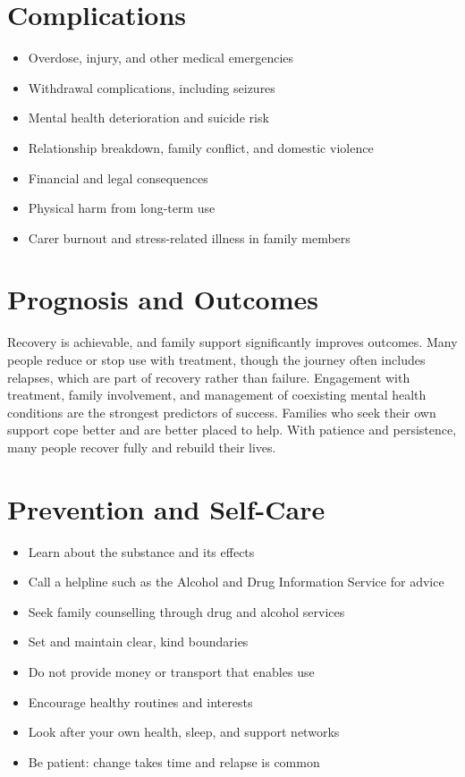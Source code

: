 \section*{Complications}
\begin{itemize}
    \item Overdose, injury, and other medical emergencies
    \item Withdrawal complications, including seizures
    \item Mental health deterioration and suicide risk
    \item Relationship breakdown, family conflict, and domestic violence
    \item Financial and legal consequences
    \item Physical harm from long-term use
    \item Carer burnout and stress-related illness in family members
\end{itemize}

\section*{Prognosis and Outcomes}
Recovery is achievable, and family support significantly improves outcomes. Many people reduce or stop use with treatment, though the journey often includes relapses, which are part of recovery rather than failure. Engagement with treatment, family involvement, and management of coexisting mental health conditions are the strongest predictors of success. Families who seek their own support cope better and are better placed to help. With patience and persistence, many people recover fully and rebuild their lives.

\section*{Prevention and Self-Care}
\begin{itemize}
    \item Learn about the substance and its effects
    \item Call a helpline such as the Alcohol and Drug Information Service for advice
    \item Seek family counselling through drug and alcohol services
    \item Set and maintain clear, kind boundaries
    \item Do not provide money or transport that enables use
    \item Encourage healthy routines and interests
    \item Look after your own health, sleep, and support networks
    \item Be patient: change takes time and relapse is common
\end{itemize}

